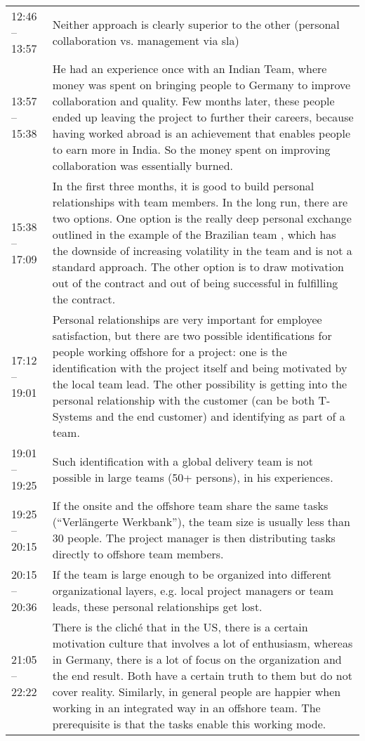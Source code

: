 \begin{appendix}
\begin{longtable}{l p{12.5cm}}
		12:46 -- 13:57&Neither approach is clearly superior to the other (personal collaboration vs. management via \gls{sla})\\
		13:57 -- 15:38&He had an experience once with an Indian Team, where money was spent on bringing people to Germany to improve collaboration and quality. Few months later, these people ended up leaving the project to further their careers, because having worked abroad is an achievement that enables people to earn more in India. So the money spent on improving collaboration was essentially burned.\\
		15:38 -- 17:09&In the first three months, it is good to build personal relationships with team members. In the long run, there are two options. One option is the really deep personal exchange outlined in the example of the Brazilian team , which has the downside of increasing volatility in the team and is not a standard approach. The other option is to draw motivation out of the contract and out of being successful in fulfilling the contract. \\
		17:12 -- 19:01&Personal relationships are very important for employee satisfaction, but there are two possible identifications for people working offshore for a project: one is the identification with the project itself and being motivated by the local team lead. The other possibility is getting into the personal relationship with the customer (can be both T-Systems and the end customer) and identifying as part of a team.\\
		19:01 -- 19:25&Such identification with a global delivery team is not possible in large teams (50+ persons), in his experiences.\\
		19:25 -- 20:15& If the onsite and the offshore team share the same tasks (``Verlängerte Werkbank''), the team size is usually less than 30 people. The project manager is then distributing tasks directly to offshore team members.\\
		20:15 -- 20:36 &If the team is large enough to be organized into different organizational layers, e.g. local project managers or team leads, these personal relationships get lost.\\
		21:05 -- 22:22&There is the clich\'{e} that in the US, there is a certain motivation culture that involves a lot of enthusiasm, whereas in Germany, there is a lot of focus on the organization and the end result. Both have a certain truth to them but do not cover reality. Similarly, in general people are happier when working in an integrated way in an offshore team. The prerequisite is that the tasks enable this working mode.\\

\end{longtable}
\end{appendix}
